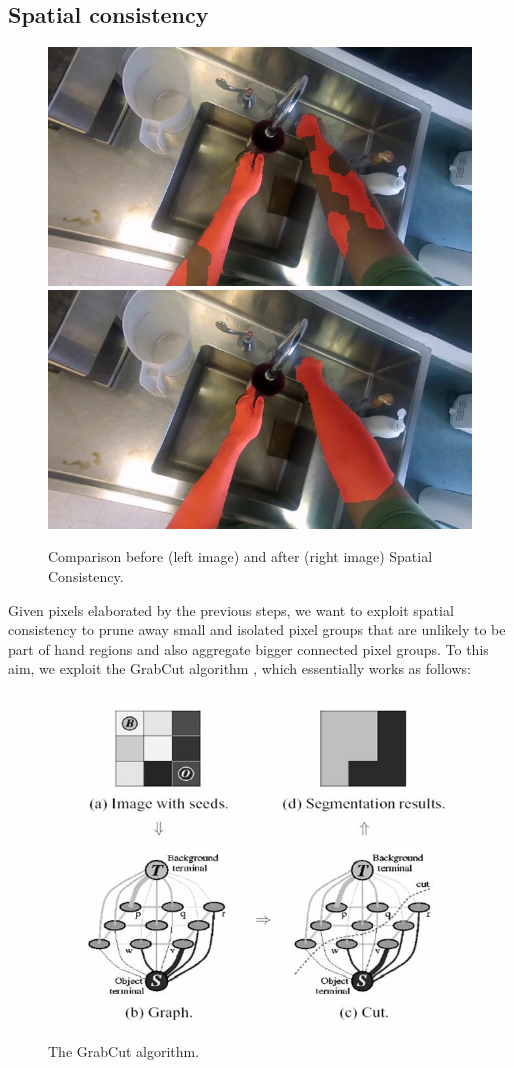 \subsection{Spatial consistency}
\begin{figure}[tb]
\centering
\includegraphics[width=.45\columnwidth]{./Figures/context-free1.jpg}
\includegraphics[width=.45\columnwidth]{./Figures/context-dependent1.jpg}
\caption{Comparison before (left image) and after (right image) Spatial Consistency.}
\label{fig:gesture_samples_space}
\end{figure}
Given pixels elaborated by the previous steps, we want to exploit spatial consistency to prune away small and isolated pixel groups that are unlikely to be part of hand regions and also aggregate bigger connected pixel groups. To this aim, we exploit the GrabCut algorithm \cite{rother04}, which essentially works as follows:

\begin{figure}[htbp]
	\centering
		\includegraphics[width=.75\linewidth]{Figures/grabcut.jpg}
	\caption{The GrabCut algorithm.}
	\label{fig:GrabCut}
\end{figure}
 
